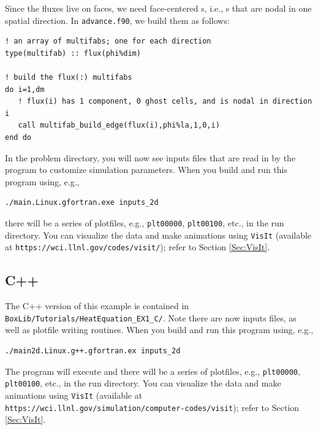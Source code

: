 Since the fluxes live on faces, we need face-centered \MultiFab s, i.e.,
\MultiFab s that are nodal in one spatial direction.  In {\tt advance.f90},
we build them as follows:
\begin{lstlisting}[backgroundcolor=\color{light-green}]
! an array of multifabs; one for each direction
type(multifab) :: flux(phi%dim) 

! build the flux(:) multifabs
do i=1,dm
   ! flux(i) has 1 component, 0 ghost cells, and is nodal in direction i
   call multifab_build_edge(flux(i),phi%la,1,0,i)
end do
\end{lstlisting}

In the problem directory, you will now see inputs files that are read in by the program
to customize simulation parameters.
When you build and run this program using, e.g.,
\begin{lstlisting}[backgroundcolor=\color{light-red}]
./main.Linux.gfortran.exe inputs_2d
\end{lstlisting}
there will be a series of plotfiles, e.g., {\tt plt00000}, 
{\tt plt00100}, etc., in the run directory.  You can visualize the data 
and make animations using {\tt VisIt} (available at {\tt https://wci.llnl.gov/codes/visit/});
refer to Section \ref{Sec:VisIt}.

\subsection{C++}
The C++ version of this example is contained in {\tt BoxLib/Tutorials/HeatEquation\_EX1\_C/}.
Note there are now inputs files, as well as plotfile writing routines.
When you build and run this program using, e.g.,
\begin{lstlisting}[backgroundcolor=\color{light-red}]
./main2d.Linux.g++.gfortran.ex inputs_2d
\end{lstlisting}
The program will execute and there will be a series of plotfiles, e.g., {\tt plt00000}, 
{\tt plt00100}, etc., in the run directory.  You can visualize the data 
and make animations using {\tt VisIt} (available at {\tt https://wci.llnl.gov/simulation/computer-codes/visit});
refer to Section \ref{Sec:VisIt}.


